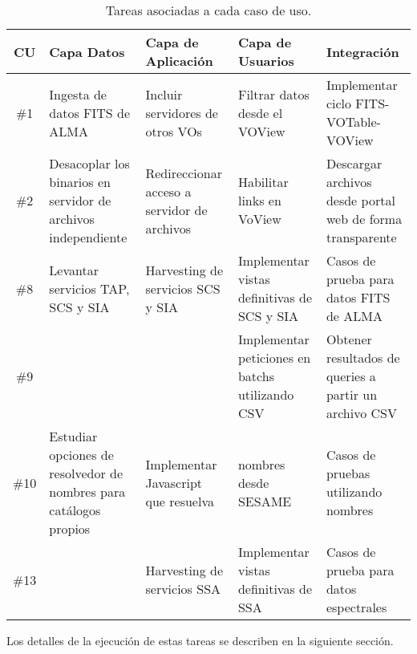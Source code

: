 \begin{table}[ht!]
    \begin{center}
	\begin{tabular}{c|p{1.2in}|p{1.4in}|p{1.3in}|p{1.3in}}
	    \textbf{CU} & \textbf{Capa Datos} &
	    \textbf{Capa de Aplicación} & \textbf{Capa de Usuarios} &
	    \textbf{Integración} \\\hline\hline
	    \#1 & 
	    Ingesta de datos FITS de ALMA & Incluir servidores de otros
	    VOs & Filtrar datos desde el VOView & Implementar ciclo
	    FITS-VOTable-VOView \\\hline
	    \#2 & Desacoplar los binarios en servidor de archivos
	    independiente & Redireccionar acceso a servidor de
	    archivos & Habilitar links en VoView & Descargar archivos
	    desde portal web de forma transparente \\\hline
	    \#8 & Levantar servicios TAP, SCS y SIA & Harvesting de
	    servicios SCS y SIA & Implementar vistas definitivas de
	    SCS y SIA & Casos de prueba para datos FITS de ALMA \\\hline
	    \#9 & & & Implementar peticiones en batchs utilizando CSV &
	    Obtener resultados de queries a partir un archivo CSV
	    \\\hline 
	    \#10 &
	    Estudiar opciones de resolvedor de nombres para catálogos
	    propios & Implementar Javascript que resuelva & nombres
	    desde SESAME & Casos de pruebas utilizando nombres \\\hline
	    \#13 & & 
	    Harvesting de servicios SSA & Implementar vistas
	    definitivas de SSA & Casos de prueba para datos
	    espectrales \\
	\end{tabular}
    \end{center}
    \caption{Tareas asociadas a cada caso de uso.}
\end{table}

Los detalles de la ejecución de estas tareas se describen en la siguiente
sección.



